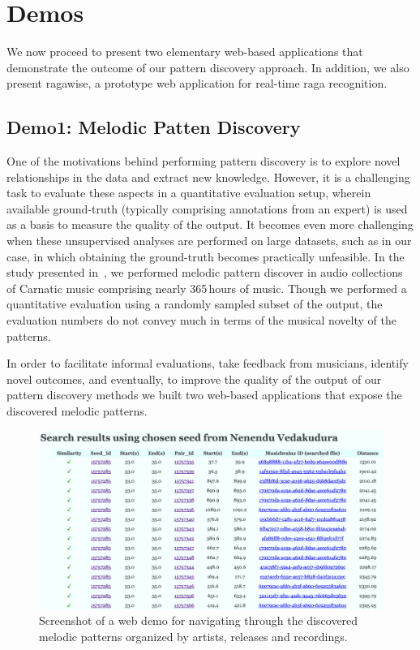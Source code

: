 \section{Demos}
\label{sec:demos}

We now proceed to present two elementary web-based applications that demonstrate the outcome of our pattern discovery approach. In addition, we also present \gls{ragawise}, a prototype web application for real-time \gls{raga} recognition. 

\subsection*{Demo1: Melodic Patten Discovery}

One of the motivations behind performing pattern discovery is to explore novel relationships in the data and extract new knowledge. However, it is a challenging task to evaluate these aspects in a quantitative evaluation setup, wherein available ground-truth (typically comprising annotations from an expert) is used as a basis to measure the quality of the output. It becomes even more challenging when these unsupervised analyses are performed on large datasets, such as in our case, in which obtaining the ground-truth becomes practically unfeasible. In the study presented in~, we performed melodic pattern discover in audio collections of Carnatic music comprising nearly 365\,hours of music. Though we performed a quantitative evaluation using a randomly sampled subset of the output, the evaluation numbers do not convey much in terms of the musical novelty of the patterns. 

In order to facilitate informal evaluations, take feedback from musicians, identify novel outcomes, and eventually, to improve the quality of the output of our pattern discovery methods we built two web-based applications that expose the discovered melodic patterns. 

\begin{figure}
	\begin{center}
		\includegraphics[width=\figSizeHundred]{ch08_applications/figures/patternBrowsing1.png}
	\end{center}
	\caption[A web demo for navigating through the discovered melodic patterns]{Screenshot of a web demo for navigating through the discovered melodic patterns organized by artists, releases and recordings.}
	\label{fig:browser_patterns}
\end{figure}

